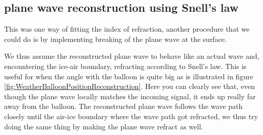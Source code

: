 \subsection{plane wave reconstruction using Snell's law}
\label{seq:SnellPW}
This was one way of fitting the index of refraction, another procedure
that we could do is by implementing breaking of the plane wave at 
the surface. 

We thus assume the reconstructed plane wave to behave like an actual wave
and, encountering the ice-air boundary, refracting according to Snell's law.
This is useful for when the angle with the balloon is quite big as is illustrated
in figure \ref{fig:WeatherBalloonPositionReconstruction}. Here you can clearly
see that, even though the plane wave locally matches the incoming signal, it
ends up really far away from the balloon. The reconstructed plane wave follows the
wave path closely until the air-ice boundary where the wave path got refracted,
we thus try doing the same thing by making the plane wave refract as well.

